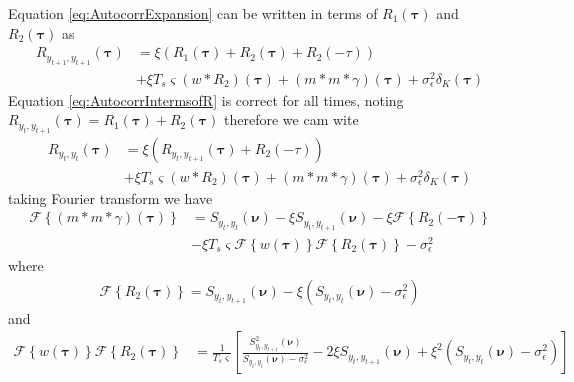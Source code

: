 \documentclass[]{article}
\begin{document}
Equation \ref{eq:AutocorrExpansion} can be written in terms of $R_1\left(\boldsymbol\tau\right)$ and $R_2\left(\boldsymbol\tau\right)$ as
\begin{align}
R_{y_{t+1},y_{t+1}}(\boldsymbol{\tau}) &=\xi \left(R_1\left(\boldsymbol\tau\right)+ R_2\left(\boldsymbol\tau\right)+R_2\left(\boldsymbol-\tau\right)\right) \nonumber \\
&+\xi T_s \varsigma\left(w\ast R_2\right)\left(\boldsymbol\tau\right)+\left(m\ast m \ast \gamma\right)\left(\boldsymbol\tau\right)+\sigma_{\epsilon}^2\delta_{K}\left(\boldsymbol\tau\right)\label{eq:AutocorrIntermsofR}
\end{align}
Equation \ref{eq:AutocorrIntermsofR} is correct for all times, noting $R_{y_{t},y_{t+1}}(\boldsymbol{\tau})=R_1\left(\boldsymbol\tau\right)+ R_2\left(\boldsymbol\tau\right) $ therefore we cam wite
\begin{align}
R_{y_{t},y_{t}}(\boldsymbol{\tau}) &=\xi \left(R_{y_{t},y_{t+1}}(\boldsymbol{\tau})+R_2\left(\boldsymbol-\tau\right)\right) \nonumber \\
&+\xi T_s \varsigma\left(w\ast R_2\right)\left(\boldsymbol\tau\right)+\left(m\ast m \ast \gamma\right)\left(\boldsymbol\tau\right)+\sigma_{\epsilon}^2\delta_{K}\left(\boldsymbol\tau\right)
\end{align}
taking Fourier transform we have
\begin{align}
 \mathcal{F}\left\{\left(m\ast m\ast \gamma\right)\left(\boldsymbol\tau\right)\right\}&=S_{y_{t},y_{t}}\left(\boldsymbol\nu\right)-\xi S_{y_{t},y_{t+1}}\left(\boldsymbol\nu\right)-\xi \mathcal{F}\left\{R_2\left(-\boldsymbol\tau\right)\right\} \nonumber\\
&-\xi T_s \varsigma  \mathcal{F}\left\{w\left(\boldsymbol\tau\right)\right\}\mathcal{F}\left\{R_2\left(\boldsymbol\tau\right)\right\}-\sigma_{\epsilon}^2 \label{eq:SensorsConvgamma}
\end{align}
where
\begin{align}
 \mathcal{F}\left\{R_2\left(\boldsymbol\tau\right)\right\}=S_{y_{t},y_{t+1}}\left(\boldsymbol\nu\right)-\xi \left(S_{y_{t},y_{t}}\left(\boldsymbol\nu\right)-\sigma_{\epsilon}^2\right)
\end{align}
and
\begin{align}
 \mathcal{F}\left\{w\left(\boldsymbol\tau\right)\right\}\mathcal{F}\left\{R_2\left(\boldsymbol\tau\right)\right\}&=\frac{1}{T_s \varsigma}\left[\frac{S_{y_{t},y_{t+1}}^2\left(\boldsymbol\nu\right)}{S_{y_{t},y_{t}}\left(\boldsymbol\nu\right)-\sigma_{\epsilon}^2}-2\xi S_{y_{t},y_{t+1}}\left(\boldsymbol\nu\right)+\xi^2\left(S_{y_{t},y_{t}}\left(\boldsymbol\nu\right)-\sigma_{\epsilon}^2\right)\right]
\end{align}
\end{document}
